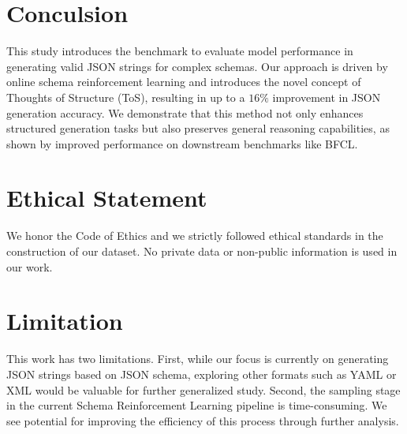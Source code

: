 \section{Conculsion}
This study introduces the \ourbench benchmark to evaluate model performance in generating valid JSON strings for complex schemas.
Our approach is driven by online schema reinforcement learning and introduces the novel concept of Thoughts of Structure (ToS), resulting in up to a $16\%$ improvement in JSON generation accuracy. 
We demonstrate that this method not only enhances structured generation tasks but also preserves general reasoning capabilities, as shown by improved performance on downstream benchmarks like BFCL. 

\section*{Ethical Statement}

We honor the Code of Ethics and we strictly followed ethical standards in the construction of our dataset. No private data or non-public information is used in our work.


\section*{Limitation}

This work has two limitations. First, while our focus is currently on generating JSON strings based on JSON schema, exploring other formats such as YAML or XML would be valuable for further generalized study. Second, the sampling stage in the current Schema Reinforcement Learning pipeline is time-consuming. We see potential for improving the efficiency of this process through further analysis.
